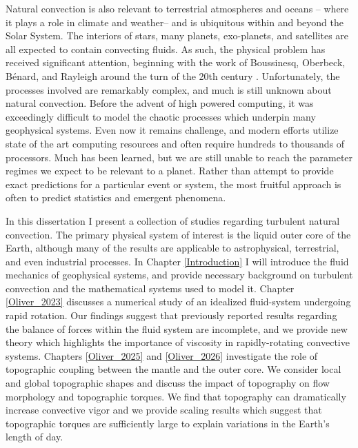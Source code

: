 Natural convection is also relevant to terrestrial atmospheres and oceans \citep{gV06}-- where it plays a role in climate and weather-- and is ubiquitous within and beyond the Solar System. The interiors of stars, many planets, exo-planets, and satellites \citep{yA21,tG25,jK22,dL23,dN25} are all expected to contain convecting fluids.
As such, the physical problem has received significant attention, beginning with the work of Boussinesq, Oberbeck, B{\'e}nard, and Rayleigh around the turn of the 20th century \citep{fB89}.
Unfortunately, the processes involved are remarkably complex, and much is still unknown about natural convection.
Before the advent of high powered computing, it was exceedingly difficult to model the chaotic processes which underpin many geophysical systems.
Even now it remains challenge, and modern efforts utilize state of the art computing resources and often require hundreds to thousands of processors. 
Much has been learned, but we are still unable to reach the parameter regimes we expect to be relevant to a planet.
Rather than attempt to provide exact predictions for a particular event or system, the most fruitful approach is often to predict statistics and emergent phenomena. 

In this dissertation I present a collection of studies regarding turbulent natural convection. 
The primary physical system of interest is the liquid outer core of the Earth, although many of the results are applicable to astrophysical, terrestrial, and even industrial processes.
In Chapter \ref{Introduction} I will introduce the fluid mechanics of geophysical systems, and provide necessary background on turbulent convection and the mathematical systems used to model it.
Chapter \ref{Oliver_2023} discusses a numerical study of an idealized fluid-system undergoing rapid rotation. 
Our findings suggest that previously reported results regarding the balance of forces within the fluid system are incomplete, and we provide new theory which highlights the importance of viscosity in rapidly-rotating convective systems.
Chapters \ref{Oliver_2025} and \ref{Oliver_2026} investigate the role of topographic coupling between the mantle and the outer core. 
We consider local and global topographic shapes and discuss the impact of topography on flow morphology and topographic torques. 
We find that topography can dramatically increase convective vigor and we provide scaling results which suggest that topographic torques are sufficiently large to explain variations in the Earth's length of day.
